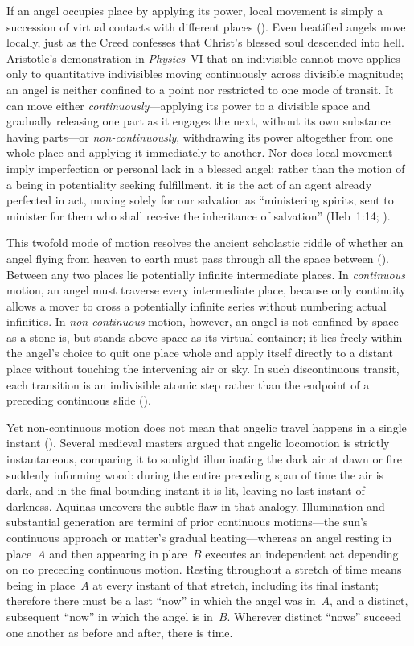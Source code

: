 If an angel occupies place by applying its power, local movement is simply a succession of virtual contacts with different places (). Even beatified angels move locally, just as the Creed confesses that Christ's blessed soul descended into hell. Aristotle's demonstration in \emph{Physics}~VI that an indivisible cannot move applies only to quantitative indivisibles moving continuously across divisible magnitude; an angel is neither confined to a point nor restricted to one mode of transit. It can move either \emph{continuously}---applying its power to a divisible space and gradually releasing one part as it engages the next, without its own substance having parts---or \emph{non-continuously}, withdrawing its power altogether from one whole place and applying it immediately to another. Nor does local movement imply imperfection or personal lack in a blessed angel: rather than the motion of a being in potentiality seeking fulfillment, it is the act of an agent already perfected in act, moving solely for our salvation as ``ministering spirits, sent to minister for them who shall receive the inheritance of salvation'' (Heb~1:14; ).

This twofold mode of motion resolves the ancient scholastic riddle of whether an angel flying from heaven to earth must pass through all the space between (). Between any two places lie potentially infinite intermediate places. In \emph{continuous} motion, an angel must traverse every intermediate place, because only continuity allows a mover to cross a potentially infinite series without numbering actual infinities. In \emph{non-continuous} motion, however, an angel is not confined by space as a stone is, but stands above space as its virtual container; it lies freely within the angel's choice to quit one place whole and apply itself directly to a distant place without touching the intervening air or sky. In such discontinuous transit, each transition is an indivisible atomic step rather than the endpoint of a preceding continuous slide ().

Yet non-continuous motion does not mean that angelic travel happens in a single instant (). Several medieval masters argued that angelic locomotion is strictly instantaneous, comparing it to sunlight illuminating the dark air at dawn or fire suddenly informing wood: during the entire preceding span of time the air is dark, and in the final bounding instant it is lit, leaving no last instant of darkness. Aquinas uncovers the subtle flaw in that analogy. Illumination and substantial generation are termini of prior continuous motions---the sun's continuous approach or matter's gradual heating---whereas an angel resting in place~$A$ and then appearing in place~$B$ executes an independent act depending on no preceding continuous motion. Resting throughout a stretch of time means being in place~$A$ at every instant of that stretch, including its final instant; therefore there must be a last ``now'' in which the angel was in~$A$, and a distinct, subsequent ``now'' in which the angel is in~$B$. Wherever distinct ``nows'' succeed one another as before and after, there is time.

